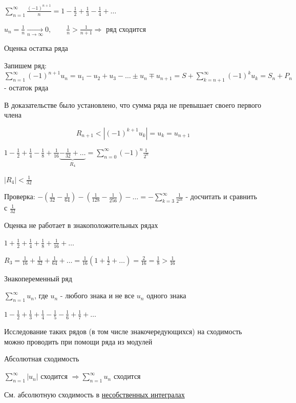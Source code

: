 \documentclass[12pt]{article}
\begin{document}
    \Exs $\sum_{n = 1}^\infty \frac{(-1)^{n + 1}}{n} = 1 - \frac{1}{2} + \frac{1}{3} - \frac{1}{4} + \dots$

    $u_n = \frac{1}{n} \underset{n \to \infty}{\longrightarrow} 0, \qquad \frac{1}{n} > \frac{1}{n + 1} \Longrightarrow$ ряд сходится

    \Nota Оценка остатка ряда

    Запишем ряд: $\sum_{n = 1}^\infty (-1)^{n + 1} u_n = u_1 - u_2 + u_3 - \dots \pm u_n \mp u_{n + 1} =
    S + \sum_{k = n + 1}^\infty (-1)^{k} u_k = S_n + P_n$ - остаток ряда

    В доказательстве \Ths было установлено, что сумма ряда не превышает своего первого члена

    \[R_{n + 1} < |(-1)^{k + 1} u_k| = u_k = u_{n + 1}\]

    \Ex $1 - \frac{1}{2} + \frac{1}{4} - \frac{1}{8} + \frac{1}{16} \underset{R_4}{\underbrace{ - \frac{1}{32} + \dots}} = \sum_{n = 0}^\infty (-1)^n \frac{1}{2^n}$

    $|R_4| < \frac{1}{32}$

    Проверка: $-(\frac{1}{32} - \frac{1}{64}) - (\frac{1}{128} - \frac{1}{256}) - \dots = -\sum_{k = 3}^\infty \frac{1}{2^{2k}}$ - \Lab досчитать и сравнить с $\frac{1}{32}$

    \Nota Оценка не работает в знакоположительных рядах

    $1 + \frac{1}{2} + \frac{1}{4} + \frac{1}{8} + \frac{1}{16} + \dots$

    $R_3 = \frac{1}{16} + \frac{1}{32} + \frac{1}{64} + \dots = \frac{1}{16} (1 + \frac{1}{2} + \dots) = \frac{2}{16} = \frac{1}{8} > \frac{1}{16}$

    \Def Знакопеременный ряд

    $\sum_{n = 1}^\infty u_n$, где $u_n$ - любого знака и не все $u_n$ одного знака

    \Ex $1 - \frac{1}{2} + \frac{1}{3} + \frac{1}{4} - \frac{1}{5} - \frac{1}{6} + \frac{1}{7} + \dots$

    \Nota Исследование таких рядов (в том числе знакочередующихся) на сходимость можно проводить при помощи ряда из модулей

    \begin{MyTheorem}
        \Ths Абсолютная сходимость

        $\sum_{n = 1}^\infty |u_n|$ сходится $\Longrightarrow \sum_{n = 1}^\infty u_n$ сходится
    \end{MyTheorem}

    \Mems См. абсолютную сходимость в \href{https://pelmesh619.github.io/itmo_conspects/conspects/calculus/calculus_superconspect.pdf}{несобственных интегралах}
\end{document}
